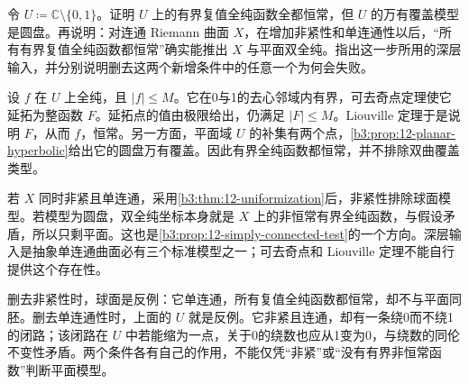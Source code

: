 \begin{exercise}[有界全纯函数不能单独检测覆盖类型]\label{b3:ex:12-8}
令 \(U\coloneqq\mathbb C\setminus\{0,1\}\)。证明 \(U\) 上的有界复值全纯函数全都恒常，但 \(U\) 的万有覆盖模型是圆盘。再说明：对连通 Riemann 曲面 \(X\)，在增加非紧性和单连通性以后，“所有有界复值全纯函数都恒常”确实能推出 \(X\) 与平面双全纯。指出这一步所用的深层输入，并分别说明删去这两个新增条件中的任意一个为何会失败。
\end{exercise}
\begin{solution}
设 \(f\) 在 \(U\) 上全纯，且 \(|f|\le M\)。它在0与1的去心邻域内有界，可去奇点定理使它延拓为整函数 \(F\)。延拓点的值由极限给出，仍满足 \(|F|\le M\)。Liouville 定理于是说明 \(F\)，从而 \(f\)，恒常。另一方面，平面域 \(U\) 的补集有两个点，\cref{b3:prop:12-planar-hyperbolic}给出它的圆盘万有覆盖。因此有界全纯函数都恒常，并不排除双曲覆盖类型。

若 \(X\) 同时非紧且单连通，采用\cref{b3:thm:12-uniformization}后，非紧性排除球面模型。若模型为圆盘，双全纯坐标本身就是 \(X\) 上的非恒常有界全纯函数，与假设矛盾，所以只剩平面。这也是\cref{b3:prop:12-simply-connected-test}的一个方向。深层输入是抽象单连通曲面必有三个标准模型之一；可去奇点和 Liouville 定理不能自行提供这个存在性。

删去非紧性时，球面是反例：它单连通，所有复值全纯函数都恒常，却不与平面同胚。删去单连通性时，上面的 \(U\) 就是反例。它非紧且连通，却有一条绕0而不绕1的闭路；该闭路在 \(U\) 中若能缩为一点，关于0的绕数也应从1变为0，与绕数的同伦不变性矛盾。两个条件各有自己的作用，不能仅凭“非紧”或“没有有界非恒常函数”判断平面模型。
\end{solution}
